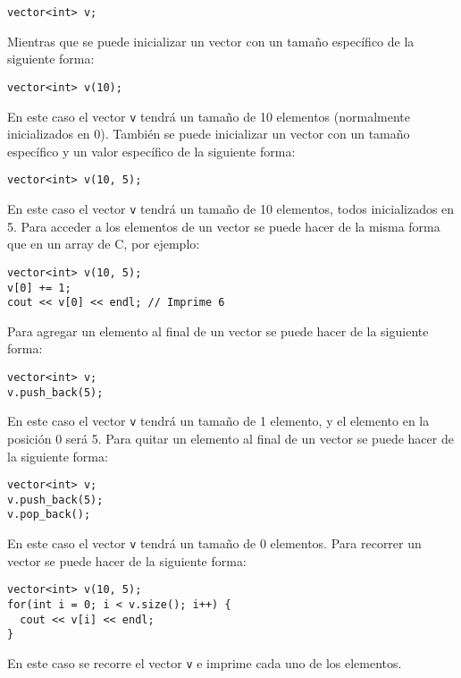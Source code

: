 \begin{lstlisting}
vector<int> v;
\end{lstlisting}

Mientras que se puede inicializar un vector con un tamaño específico de la siguiente forma:

\begin{lstlisting}
vector<int> v(10);
\end{lstlisting}

En este caso el vector \texttt{v} tendrá un tamaño de 10 elementos (normalmente inicializados en 0). También se puede
inicializar un vector con un tamaño específico y un valor específico de la siguiente forma:

\begin{lstlisting}
vector<int> v(10, 5);
\end{lstlisting}

En este caso el vector \texttt{v} tendrá un tamaño de 10 elementos, todos inicializados en 5. Para acceder a los
elementos de un vector se puede hacer de la misma forma que en un array de C, por ejemplo:

\begin{lstlisting}
vector<int> v(10, 5);
v[0] += 1;
cout << v[0] << endl; // Imprime 6
\end{lstlisting}

Para agregar un elemento al final de un vector se puede hacer de la siguiente forma:

\begin{lstlisting}
vector<int> v;
v.push_back(5);
\end{lstlisting}

En este caso el vector \texttt{v} tendrá un tamaño de 1 elemento, y el elemento en la posición 0 será 5. Para quitar un
elemento al final de un vector se puede hacer de la siguiente forma:

\begin{lstlisting}
vector<int> v;
v.push_back(5);
v.pop_back();
\end{lstlisting}

En este caso el vector \texttt{v} tendrá un tamaño de 0 elementos. Para recorrer un vector se puede hacer de la
siguiente forma:

\begin{lstlisting}
vector<int> v(10, 5);
for(int i = 0; i < v.size(); i++) {
  cout << v[i] << endl;
}
\end{lstlisting}

En este caso se recorre el vector \texttt{v} e imprime cada uno de los elementos.

